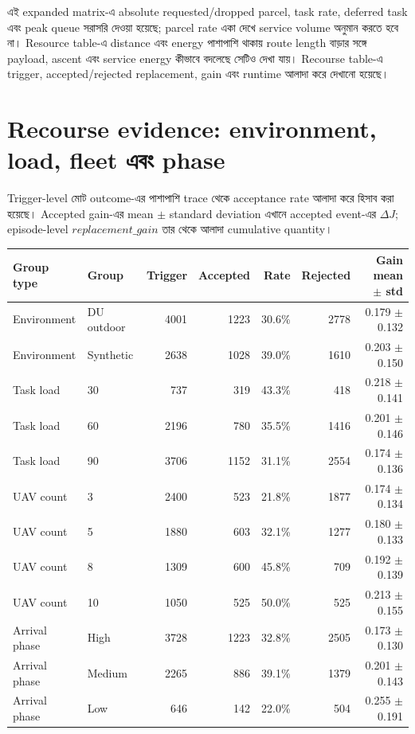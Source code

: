\documentclass[10pt,a4paper]{article}
\begin{document}
এই expanded matrix-এ absolute requested/dropped parcel, task rate, deferred task এবং peak queue সরাসরি দেওয়া হয়েছে; parcel rate একা দেখে service volume অনুমান করতে হবে না। Resource table-এ distance এবং energy পাশাপাশি থাকায় route length বাড়ার সঙ্গে payload, ascent এবং service energy কীভাবে বদলেছে সেটিও দেখা যায়। Recourse table-এ trigger, accepted/rejected replacement, gain এবং runtime আলাদা করে দেখানো হয়েছে।
\section{Recourse evidence: environment, load, fleet এবং phase}
Trigger-level মোট outcome-এর পাশাপাশি trace থেকে acceptance rate আলাদা করে হিসাব করা হয়েছে। Accepted gain-এর mean $\pm$ standard deviation এখানে accepted event-এর $\Delta J$; episode-level $replacement\_gain$ তার থেকে আলাদা cumulative quantity।
\begin{table}[H]\centering\scriptsize\begin{tabular}{@{}llrrrrr@{}}\toprule Group type & Group & Trigger & Accepted & Rate & Rejected & Gain mean $\pm$ std\\\midrule
Environment & DU outdoor & 4001 & 1223 & 30.6\% & 2778 & 0.179 $\pm$ 0.132 \\
Environment & Synthetic & 2638 & 1028 & 39.0\% & 1610 & 0.203 $\pm$ 0.150 \\
Task load & 30 & 737 & 319 & 43.3\% & 418 & 0.218 $\pm$ 0.141 \\
Task load & 60 & 2196 & 780 & 35.5\% & 1416 & 0.201 $\pm$ 0.146 \\
Task load & 90 & 3706 & 1152 & 31.1\% & 2554 & 0.174 $\pm$ 0.136 \\
UAV count & 3 & 2400 & 523 & 21.8\% & 1877 & 0.174 $\pm$ 0.134 \\
UAV count & 5 & 1880 & 603 & 32.1\% & 1277 & 0.180 $\pm$ 0.133 \\
UAV count & 8 & 1309 & 600 & 45.8\% & 709 & 0.192 $\pm$ 0.139 \\
UAV count & 10 & 1050 & 525 & 50.0\% & 525 & 0.213 $\pm$ 0.155 \\
Arrival phase & High & 3728 & 1223 & 32.8\% & 2505 & 0.173 $\pm$ 0.130 \\
Arrival phase & Medium & 2265 & 886 & 39.1\% & 1379 & 0.201 $\pm$ 0.143 \\
Arrival phase & Low & 646 & 142 & 22.0\% & 504 & 0.255 $\pm$ 0.191 \\
\bottomrule\end{tabular}\end{table}
\end{document}
